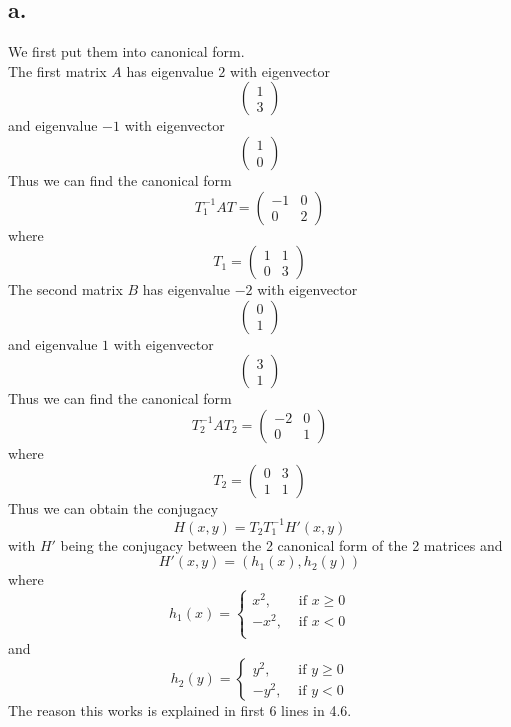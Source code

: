 \documentclass[11pt]{article}
\theoremstyle{mystyle}
\theoremstyle{definition}
\begin{document}
\subsection*{a.}
We first put them into canonical form. \\
The first matrix $A$ has eigenvalue $2$ with eigenvector 
\[
  \begin{pmatrix}
    1 \\
    3
  \end{pmatrix}
\]
and eigenvalue $-1$ with eigenvector 
\[
  \begin{pmatrix}
    1 \\ 
    0
  \end{pmatrix}
\]
Thus we can find the canonical form 
\[
 T_1^{-1}AT = 
 \begin{pmatrix}
  -1 & 0 \\
  0 & 2
\end{pmatrix}  
\]
where
\[
  T_1 = 
  \begin{pmatrix}
    1 & 1 \\
    0 & 3
  \end{pmatrix}
\]
The second matrix $B$ has eigenvalue $-2$ with eigenvector 
\[
  \begin{pmatrix}
    0 \\
    1
  \end{pmatrix}
\]
and eigenvalue $1$ with eigenvector 
\[
  \begin{pmatrix}
    3 \\ 
    1
  \end{pmatrix}
\]
Thus we can find the canonical form 
\[
 T_2^{-1} A T_2 = \begin{pmatrix}
  -2 & 0 \\
  0 & 1
\end{pmatrix}  
\]
where 
\[
  T_2 = 
  \begin{pmatrix}
    0 & 3 \\
    1 & 1
  \end{pmatrix}
\]
Thus we can obtain the conjugacy
\[
  H(x,y) = T_2 T_1^{-1} H'(x,y)
\]
with $H'$ being the conjugacy between the 2 canonical form of the 2 matrices and 
\[
  H'(x,y) = (h_1(x), h_2(y))
\]
where 
\[
  h_1(x) = 
  \begin{cases}
    x^2, &\text{ if } x \ge 0\\
    -x^2, &\text{ if } x < 0\\
  \end{cases}
\]
and 
\[
  h_2(y) = 
  \begin{cases}
    y^2, &\text{ if } y \ge 0 \\
    -y^2, &\text{ if } y < 0
  \end{cases}
\]
The reason this works is explained in first 6 lines in 4.6.
\end{document}
